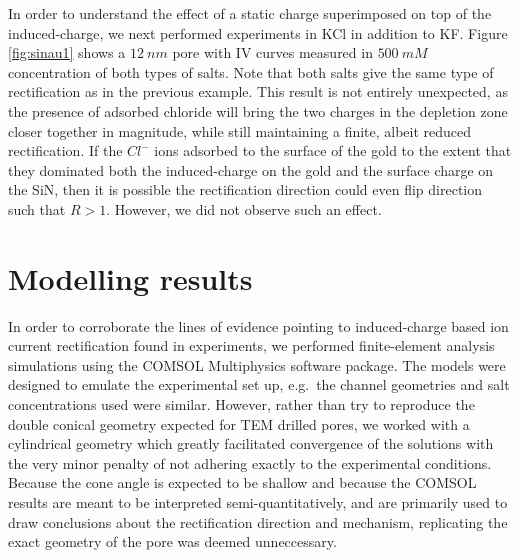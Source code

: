 		In order to understand the effect of a static charge superimposed on top of the induced-charge, we next performed experiments in KCl in addition to KF. Figure \ref{fig:sinau1} shows a $\SI{12}{nm}$ pore with IV curves measured in $\SI{500}{mM}$ concentration of both types of salts. Note that both salts give the same type of rectification as in the previous example. This result is not entirely unexpected, as the presence of adsorbed chloride will bring the two charges in the depletion zone closer together in magnitude, while still maintaining a finite, albeit reduced rectification. If the $Cl^{-}$ ions adsorbed to the surface of the gold to the extent that they dominated both the induced-charge on the gold and the surface charge on the SiN, then it is possible the rectification direction could even flip direction such that $R>1$. However, we did not observe such an effect.
		
	\section{Modelling results}
		
		In order to corroborate the lines of evidence pointing to induced-charge based ion current rectification found in experiments, we performed finite-element analysis simulations using the COMSOL Multiphysics software package. The models were designed to emulate the experimental set up, e.g.~the channel geometries and salt concentrations used were similar. However, rather than try to reproduce the double conical geometry expected for TEM drilled pores, we worked with a cylindrical geometry which greatly facilitated convergence of the solutions with the very minor penalty of not adhering exactly to the experimental conditions. Because the cone angle is expected to be shallow and because the COMSOL results are meant to be interpreted semi-quantitatively, and are primarily used to draw conclusions about the rectification direction and mechanism, replicating the exact geometry of the pore was deemed unneccessary.
		
		
			
			
		
			
		
			
	
		
		
		
		
	

	





